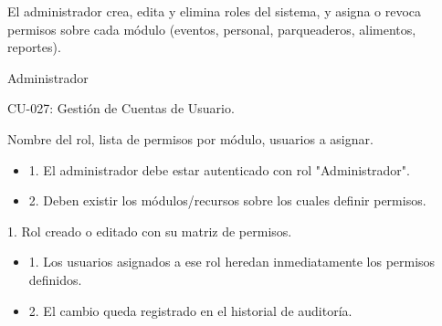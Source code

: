\begin{description}[leftmargin=!, labelwidth=3.4cm, style=nextline, topsep=3pt]
\item[Objetivo] El administrador crea, edita y elimina roles del sistema, y asigna o revoca permisos sobre cada módulo (eventos, personal, parqueaderos, alimentos, reportes).

\item[Actores] Administrador

\item[CU relacionados] CU-027: Gestión de Cuentas de Usuario.

\item[Entradas] Nombre del rol, lista de permisos por módulo, usuarios a asignar.

\item[Pre-condiciones] \hfill
\begin{itemize}[leftmargin=1.2em, topsep=1pt]
  \item 1. El administrador debe estar autenticado con rol "Administrador".
  \item 2. Deben existir los módulos/recursos sobre los cuales definir permisos.
\end{itemize}

\item[Salidas] 1. Rol creado o editado con su matriz de permisos.

\item[Post-condiciones] \hfill
\begin{itemize}[leftmargin=1.2em, topsep=1pt]
  \item 1. Los usuarios asignados a ese rol heredan inmediatamente los permisos definidos.
  \item 2. El cambio queda registrado en el historial de auditoría.
\end{itemize}

\end{description}


